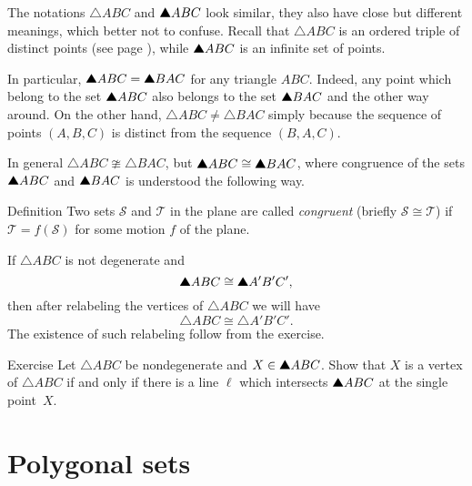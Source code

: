 

The notations $\triangle ABC$ and $\solidtriangle ABC$ look similar,
they also have close but different meanings, 
which better not to confuse.
Recall that $\triangle ABC$ is an ordered triple of distinct points
(see page \pageref{page:def:triangle}),
while $\solidtriangle ABC$ is an infinite set of points.

In particular, $\solidtriangle ABC=\solidtriangle BAC$ for any triangle $ABC$.
Indeed, any point which belong to the set $\solidtriangle ABC$ 
also belongs to the set $\solidtriangle BAC$
and the other way around.
On the other hand,
$\triangle ABC\ne\triangle BAC$ simply because the sequence of points $(A,B,C)$ is distinct from the sequence $(B,A,C)$.

In general  $\triangle ABC\ncong\triangle BAC$, but $\solidtriangle ABC\cong\solidtriangle BAC$, where congruence of the sets $\solidtriangle ABC$ and $\solidtriangle BAC$ 
is understood the following way.

\begin{thm}{Definition}\label{def:cong-sets}
Two sets $\mathcal{S}$ and $\mathcal{T}$ in the plane  
are called \emph{congruent} 
(briefly $\mathcal{S}\cong \mathcal{T}$)
if 
$\mathcal{T}=f(\mathcal{S})$ for some motion $f$ of the plane.
\end{thm}

If $\triangle ABC$ is not degenerate
and \[\solidtriangle ABC\cong \solidtriangle A'B'C',\]
then after relabeling the vertices of $\triangle ABC$ 
we will have 
\[\triangle ABC\cong \triangle A'B'C'.\]
The existence of such relabeling follow from the exercise.

\begin{thm}{Exercise}\label{ex:vertex}
Let $\triangle ABC$ be nondegenerate and $X\z\in \solidtriangle ABC$.
Show that $X$ is a vertex of $\triangle ABC$
if and only if there is a line $\ell$ which intersects $\solidtriangle ABC$
at the single point~$X$.
\end{thm}

\section*{Polygonal sets}

